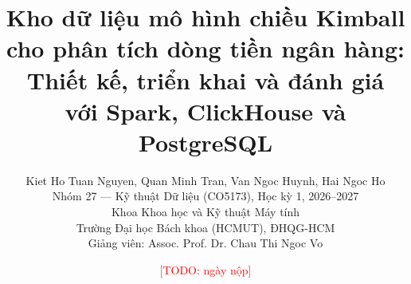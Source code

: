 \documentclass[peerreview]{IEEEtran}
\newcommand{\todo}[1]{\textcolor{red}{[TODO: #1]}}
\begin{document}
\renewcommand{\tablename}{Bảng}
\renewcommand{\figurename}{Hình}
\renewcommand{\lstlistingname}{Mã nguồn}
\renewcommand{\contentsname}{Mục lục}
\renewcommand{\listfigurename}{Danh sách hình}
\renewcommand{\listtablename}{Danh sách bảng}
\renewcommand{\abstractname}{Tóm tắt}
\renewcommand{\refname}{Tài liệu tham khảo}
\renewcommand{\appendixname}{Phụ lục}

\title{Kho dữ liệu mô hình chiều Kimball cho phân tích dòng tiền ngân hàng: \\
Thiết kế, triển khai và đánh giá \\ với Spark, ClickHouse và PostgreSQL}

\author{Kiet Ho Tuan Nguyen, Quan Minh Tran, Van Ngoc Huynh, Hai Ngoc Ho \\
Nhóm 27 --- Kỹ thuật Dữ liệu (CO5173), Học kỳ 1, 2026--2027\\
Khoa Khoa học và Kỹ thuật Máy tính\\
Trường Đại học Bách khoa (HCMUT), ĐHQG-HCM\\
Giảng viên: Assoc. Prof. Dr. Chau Thi Ngoc Vo\\
}
\date{\todo{ngày nộp}}

\maketitle
\tableofcontents
\listoffigures
\listoftables

\IEEEpeerreviewmaketitle
\end{document}
